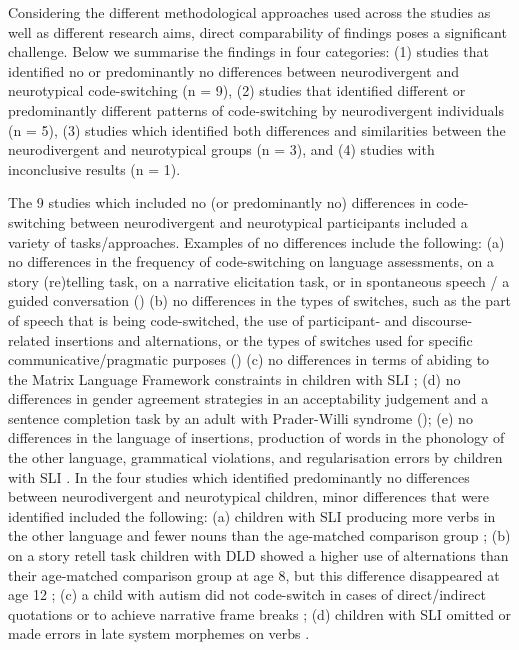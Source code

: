 \documentclass[output=paper]{langscibook}
\begin{document}
Considering the different methodological approaches used across the studies as well as different research aims, direct comparability of findings poses a significant challenge. Below we summarise the findings in four categories:
(1) studies that identified no or predominantly no differences between neurodivergent and neurotypical code-switching (n = 9),
(2) studies that identified different or predominantly different patterns of code-switching by neurodivergent individuals (n = 5),
(3) studies which identified both differences and similarities between the neurodivergent and neurotypical groups (n = 3), and
(4) studies with inconclusive results (n = 1).

The 9 studies which included no (or predominantly no) differences in code-switching between neurodivergent and neurotypical participants included a variety of tasks/approaches. Examples of no differences  include the following:
(a) no differences in the frequency of code-switching on language assessments, on a story (re)telling task, on a narrative elicitation task, or in spontaneous speech / a guided conversation (\citealt{Aguilar-MediavillaEtAl2024, Gutiérrez-ClellenEtAl2009, KapantzoglouEtAl2021, Pert2007, Ponce-Lawler2017, Sanz-TorrentEtAl2007})
(b) no differences in the types of switches, such as the part of speech that is being code-switched, the use of participant- and discourse-related insertions and alternations, or the types of switches used for specific communicative/pragmatic purposes  (\citealt{AnguloJimenez2020, Gutiérrez-ClellenEtAl2009, Ponce-Lawler2017, Yu2016})
(c) no differences in terms of abiding to the Matrix Language Framework constraints in children with SLI \citep{Gutiérrez-ClellenEtAl2009};
(d) no differences in gender agreement strategies in an acceptability judgement and a sentence completion task by an adult with Prader-Willi syndrome (\citealt{LicerasGarcia-Alcaraz2019}); (e) no differences in the language of insertions, production of words in the phonology of the other language, grammatical violations, and regularisation errors by children with SLI \citep{Sanz-TorrentEtAl2007}. In the four studies which identified predominantly no differences between neurodivergent and neurotypical children, minor differences that were identified included the following:
(a) children with SLI producing more verbs in the other language and fewer nouns than the age-matched comparison group \citep{Sanz-TorrentEtAl2007};
(b) on a story retell task children with DLD showed a higher use of alternations than their age-matched comparison group at age 8, but this difference disappeared at age 12 \citep{Aguilar-MediavillaEtAl2024};
(c) a child with autism did not code-switch in cases of direct/indirect quotations or to achieve narrative frame breaks \citep{Yu2016};
(d) children with SLI omitted or made errors in late system morphemes on verbs \citep{Pert2007}.
\end{document}
